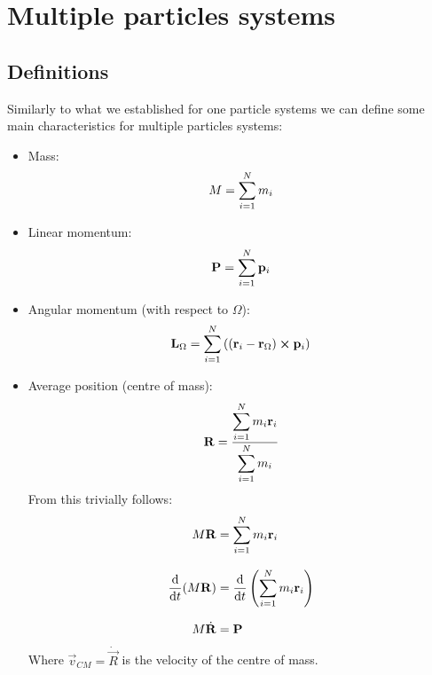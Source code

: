 \section{Multiple particles systems}
\subsection{Definitions}
Similarly to what we established for one particle systems we can define some main characteristics for multiple particles systems:
\begin{itemize}
    \item Mass:\begin{equation}
        M = \displaystyle\sum_{i=1}^{N} m_i
    \end{equation}
    \item Linear momentum:\begin{equation}
        \vb{P} = \displaystyle\sum_{i=1}^{N} \vb{p}_i
    \end{equation}
    \item Angular momentum (with respect to $\Omega$):\begin{equation}
        \vb{L}_{\Omega} = \displaystyle\sum_{i=1}^{N} \left(\left(\vb{r}_i-\vb{r}_{\Omega}\right) \cross \vb{p}_i\right)
    \end{equation}
    \item Average position (centre of mass): \begin{equation} \label{e:centre_of_mass}
        \vb{R} = \dfrac{\displaystyle\sum_{i=1}^{N}m_i\vb{r}_i}{\displaystyle\sum_{i=1}^{N}m_i}
    \end{equation}
    From this trivially follows:
    \begin{equation}
        \begin{split}
          M \vb{R} &= \displaystyle\sum_{i=1}^{N}m_i\vb{r}_i \\[8pt]
          \dfrac{\mathrm{d}}{\mathrm{d}t}(M \vb{R}) &= \dfrac{\mathrm{d}}{\mathrm{d}t}\left(\displaystyle\sum_{i=1}^{N}m_i\vb{r}_i\right) \\[8pt]
          M \dot{\vb{R}} &= \vb{P}
        \end{split}
    \end{equation}
    Where $\vec{v}_{CM} = \dot{\vec{R}}$ is the velocity of the centre of mass.
\end{itemize}
